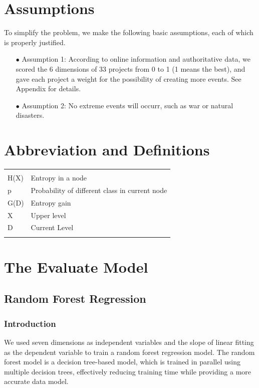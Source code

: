 \documentclass[a4paper]{article}
\begin{document}
\section{Assumptions}
To simplify the problem, we make the following basic assumptions, each of which is
properly justified.
\begin{itemize}
\item[$\bullet$]Assumption 1: According to online information and authoritative data, 
we scored the 6 dimensions of 33 projects from 0 to 1 (1 means the best), and gave each project a weight for the possibility of creating more events. See Appendix for details.
\item[$\bullet$]Assumption 2:  No extreme events will occurr, such as war or natural disasters.
\end{itemize}
\section{Abbreviation and Definitions}
\begin{table}[h]
    \begin{tabular}{l|l}
    \hline
    \\
    H(X) & Entropy in a node                              \\
    p    & Probability of different class in current node \\
    G(D) & Entropy gain                                   \\
    X    & Upper level                                    \\
    D    & Current Level                                  \\ 
    \\\hline
    \end{tabular}
    \end{table}
\section{The Evaluate Model}

\subsection{Random Forest Regression}
\subsubsection{Introduction}
We used seven dimensions as independent variables and the slope of linear fitting as the dependent variable to train a random forest regression model. The random forest model is a decision tree-based model, which is trained in parallel using multiple decision trees, effectively reducing training time while providing a more accurate data model.
\end{document}

